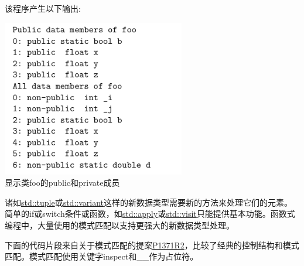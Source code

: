 该程序产生以下输出:

\begin{center}
\includegraphics[width=0.6\textwidth]{content/5/chapter8/images/8.png}\\
显示类foo的public和private成员
\end{center}


诸如\href{https://en.cppreference.com/w/cpp/utility/tuple}{std::tuple}或\href{https://en.cppreference.com/w/cpp/utility/variant}{std::variant}这样的新数据类型需要新的方法来处理它们的元素。简单的if或switch条件或函数，如\href{https://en.cppreference.com/w/cpp/utility/apply}{std::apply}或\href{https://en.cppreference.com/w/cpp/utility/variant/visit}{std::visit}只能提供基本功能。函数式编程中，大量使用的模式匹配以支持更强大的新数据类型处理。

下面的代码片段来自关于模式匹配的提案\href{http://www.open-std.org/jtc1/sc22/wg21/docs/papers/2020/p1371r2.pdf}{P1371R2}，比较了经典的控制结构和模式匹配。模式匹配使用关键字inspect和\_\_作为占位符。

